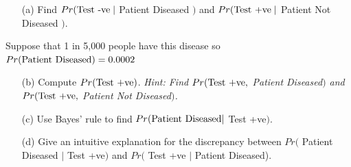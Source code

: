 \documentclass{article}
\newcommand{\1}{\mathbf{1}}
\begin{document}
\begin{enumerate}
    \item[(a)] Find $Pr(\hbox{Test -ve} \mid $ Patient Diseased $)$ and $Pr(\hbox{Test +ve} \mid$ Patient Not Diseased $)$.
\end{enumerate}

Suppose that 1 in 5,000 people have this disease so $Pr(\hbox{Patient Diseased}) = 0.0002$
\begin{enumerate}
    \item[(b)] Compute $Pr( \hbox{Test +ve} )$. {\it Hint: Find $Pr(\hbox{Test +ve},$ {Patient Diseased}$)$ and $Pr(\hbox{Test +ve},$ {Patient Not Diseased}$)$.}
    \item[(c)] Use Bayes' rule to find $Pr(\hbox{Patient Diseased} |$ {Test +ve}$)$.
    \item[(d)] Give an intuitive explanation for the discrepancy between $Pr($ Patient Diseased $|$ {Test +ve}$)$ and $Pr($ {Test +ve} $|$ Patient Diseased).
\end{enumerate}
\end{document}
